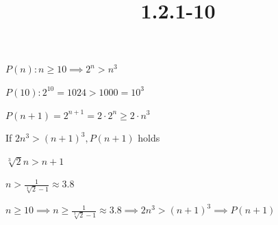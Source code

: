 \documentclass{article}
\title{1.2.1-10}
\begin{document}
\maketitle

$P(n): n \geq 10 \implies 2^n > n^3$

$P(10): 2^{10}=1024 > 1000 = 10^3$

$P(n+1) = 2^{n+1} = 2\cdot2^n \geq 2 \cdot n^3$

If $2n^3 > (n+1)^3, P(n+1)$ holds

$\sqrt[3]{2} n > n + 1$

$n > \frac{1}{\sqrt[3]{2} - 1} \approx 3.8$

$n \geq 10 \implies n \geq \frac{1}{\sqrt[3]{2} - 1} \approx 3.8 \implies 2n^3 > (n+1)^3 \implies P(n+1)$
\end{document}
